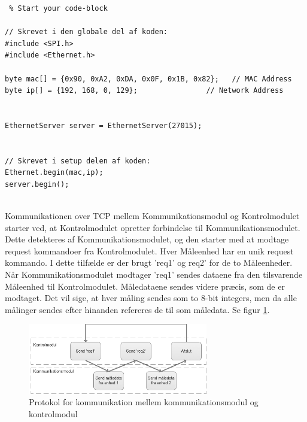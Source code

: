 \begin{lstlisting} % Start your code-block

// Skrevet i den globale del af koden:
#include <SPI.h>
#include <Ethernet.h>

byte mac[] = {0x90, 0xA2, 0xDA, 0x0F, 0x1B, 0x82};   // MAC Address
byte ip[] = {192, 168, 0, 129};                // Network Address


EthernetServer server = EthernetServer(27015);


// Skrevet i setup delen af koden:
Ethernet.begin(mac,ip);
server.begin();


\end{lstlisting}


Kommunikationen over TCP mellem Kommunikationsmodul og Kontrolmodulet starter ved, at Kontrolmodulet opretter forbindelse til Kommunikationsmodulet. Dette detekteres af Kommunikationsmodulet, og den starter med at modtage request kommandoer fra Kontrolmodulet. Hver Måleenhed har en unik request kommando. I dette tilfælde er der brugt 'req1' og req2' for de to Måleenheder. Når Kommunikationsmodulet modtager 'req1' sendes dataene fra den tilsvarende Måleenhed til Kontrolmodulet. Måledataene sendes videre præcis, som de er modtaget. Det vil sige, at hver måling sendes som to 8-bit integers, men da alle målinger sendes efter hinanden refereres de til som måledata. Se figur \ref{fig:TCPProtokol}.

\begin{figure}[H] %
	\centering
	\includegraphics[width=0.7\textwidth]{Figure/TCPProtokol}
	\caption{Protokol for kommunikation mellem kommunikationsmodul og kontrolmodul}
	\label{fig:TCPProtokol}
\end{figure}



